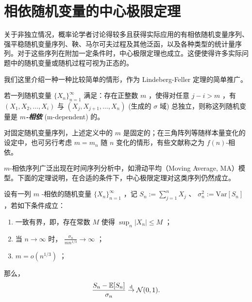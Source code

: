 \section{相依随机变量的中心极限定理}

关于非独立情况，概率论学者讨论得较多且获得实际应用的有相依随机变量序列、强平稳随机变量序列、鞅、马尔可夫过程及其他泛函，以及各种类型的统计量序列。对于这些序列在附加一定条件时，中心极限定理也成立。这便使得许多实际问题中的随机变量或随机过程可视为正态的。

我们这里介绍一种一种比较简单的情形，作为 Lindeberg-Feller 定理的简单推广。

\begin{definition*}[$m$-相依]

若一列随机变量 $\{X_n\}_{n=1}^\infty$ 满足：存在正整数 $m$ ，使得对任意 $j-i> m$ ，有 $(X_1,X_2,\dots,X_i)$ 与 $(X_{j},X_{j+1},\dots,X_n)$ (生成的 $\sigma$ 域) 总独立，则称这列随机变量是 \textbf{\emph{$m$-相依}} (m-dependent) 的。

\end{definition*}

\begin{remark}
对固定随机变量序列，上述定义中的 $m$ 是固定的；在三角阵列等随样本量变化的设定中，也可另行考虑 $m=m_n$ 随 $n$ 变化的情形，有些文献称之为 $f(n)$-相依。
\end{remark}

$m$-相依序列广泛出现在时间序列分析中，如滑动平均（Moving Average, MA）模型。下面的定理说明，在合适的条件下，中心极限定理对这类序列仍然成立。

\begin{theorem}

\label{thm:ch3:3-13}

设有一列 $m$ -相依的随机变量 $\{X_n\}_{n=1}^\infty$ ，记 $S_n:=\sum\limits_{j=1}^nX_j$ 、 $\sigma_n^2:=\mathrm{Var}[S_n]$，若如下条件成立：

\begin{enumerate}
\def\labelenumi{\arabic{enumi}.}
\tightlist
\item
  一致有界，即，存在常数 $M$ 使得 $\sup_n|X_n|\le M$ ；
\item
  当 $n\to\infty$ 时， $\frac{\sigma_n}{mn^{1/3}}\to \infty$ ；
\item
  $m=o(n^{1/3})$ ；
\end{enumerate}

那么，
\[
\frac{S_n-\mathbb{E}[S_n]}{\sigma_n}\overset{\rm d}\to \mathcal N(0,1).
\]

\end{theorem}

